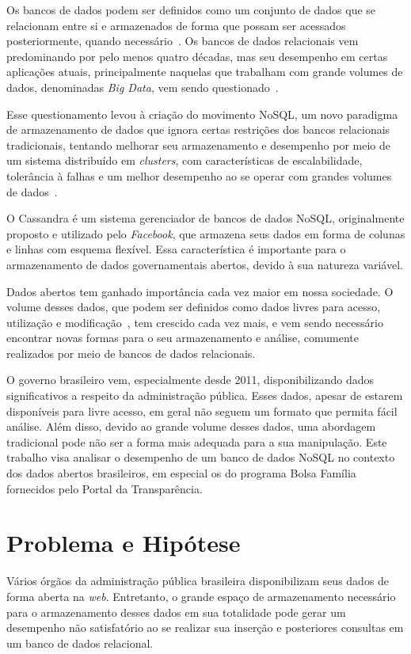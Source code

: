 Os bancos de dados podem ser definidos como um conjunto de dados que se relacionam entre si e armazenados de forma que possam ser acessados posteriormente, quando necessário~\cite{cjdate}.
Os bancos de dados relacionais vem predominando por pelo menos quatro décadas, mas seu desempenho em certas aplicações atuais, principalmente naquelas que trabalham com grande volumes de dados, denominadas \emph{Big Data}, vem sendo questionado~\cite{pramod}. 

Esse questionamento levou à criação do movimento NoSQL, um novo paradigma de armazenamento de dados que ignora certas restrições dos bancos relacionais tradicionais, tentando melhorar seu armazenamento e desempenho por meio de um sistema distribuído em \emph{clusters}, com características de escalabilidade, tolerância à falhas e um melhor desempenho ao se operar com grandes volumes de dados~\cite{pramod}.

O Cassandra é um sistema gerenciador de bancos de dados NoSQL, originalmente proposto e utilizado pelo \emph{Facebook}, que armazena seus dados em forma de colunas e linhas com esquema flexível. Essa característica é importante para o armazenamento de dados governamentais abertos, devido à sua natureza variável.

Dados abertos tem ganhado importância cada vez maior em nossa sociedade. O volume desses dados, que podem ser definidos como dados livres para acesso, utilização e modificação~\cite{opendefinition}, tem crescido cada vez mais, e vem sendo necessário encontrar novas formas para o seu armazenamento e análise, comumente realizados por meio de bancos de dados relacionais.

O governo brasileiro vem, especialmente desde 2011, disponibilizando dados significativos a respeito da administração pública. Esses dados, apesar de estarem disponíveis para livre acesso, em geral não seguem um formato que permita fácil análise. Além disso, devido ao grande volume desses dados, uma abordagem tradicional pode não ser a forma mais adequada para a sua manipulação. Este trabalho visa analisar o desempenho de um banco de dados NoSQL no contexto dos dados abertos brasileiros, em especial os do programa Bolsa Família fornecidos pelo Portal da Transparência.

\section{Problema e Hipótese}
Vários órgãos da administração pública brasileira disponibilizam seus dados de forma aberta na \emph{web}. Entretanto, o grande espaço de armazenamento necessário para o armazenamento desses dados em sua totalidade pode gerar um desempenho não satisfatório ao se realizar sua inserção e posteriores consultas em um banco de dados relacional.

